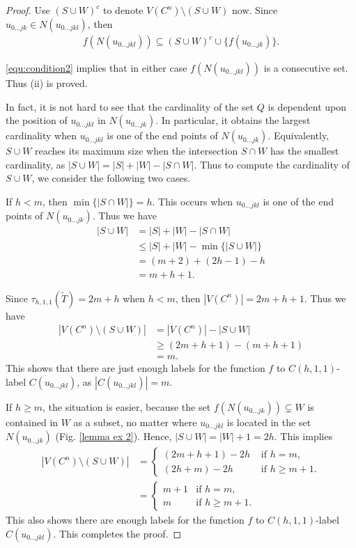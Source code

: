 \begin{proof}
Use $(S \cup W)^c$ to denote $V(C^n) \setminus (S \cup W)$ now. Since $u_{0\dots jk} \in N(u_{0\dots jkl})$, then 
\begin{align}
\label{equ:condition2}
f(N(u_{0\dots jkl})) \subseteq (S \cup W)^c \cup \{f(u_{0\dots jk})\}.
\end{align}

\eqref{equ:condition2} implies that in either case $f(N(u_{0\dots jkl}))$ is a consecutive set. Thus (ii) is proved.

In fact, it is not hard to see that the cardinality of the set $Q$ is dependent upon the position of $u_{0\dots jkl}$ in $N(u_{0\dots jk})$. In particular, it obtains the largest cardinality when $u_{0\dots jkl}$ is one of the end points of $N(u_{0\dots jk})$. Equivalently, $S \cup W$ reaches its maximum size when the intersection $S\cap W$ has the smallest cardinality, as $|S \cup W| = |S| + |W| - |S \cap W|$. Thus to compute the cardinality of $S\cup W$, we consider the following two cases. 

If $h < m$, then $\min\{|S \cap W|\} = h$. This occurs when $u_{0\dots jkl}$ is one of the end points of $N(u_{0\dots jk})$. Thus we have 
\begin{align*}
|S \cup W| &= |S| + |W| - |S \cap W| \\
& \le |S| + |W| - \min\{|S \cup W|\} \\
& = (m+2) + (2h-1) - h\\
&= m+h+1.
\end{align*}

Since $\tau_{h,1,1}(\tilde{T}) = 2m+h$ when $h < m$, then $|V(C^n)| = 2m+h+1$. Thus we have 
\begin{align*}
|V(C^n) \setminus (S \cup W)| &= |V(C^n)| - |S\cup W|\\
& \ge (2m+h+1) - (m+h+1) \\
&= m.
\end{align*}
This shows that there are just enough labels for the function $f$ to $C(h,1,1)$-label $C(u_{0\dots jkl})$, as $|C(u_{0\dots jkl})| = m$. 

If $h \ge m$, the situation is easier, because the set $f(N(u_{0\dots jk})) \subsetneq W$ is contained in $W$ as a subset, no matter where $u_{0\dots jkl}$ is located in the set $N(u_{0\dots jk})$ (Fig. \ref{lemma ex 2}). Hence, $|S \cup W| = |W| +1= 2h$. This implies 
\begin{align*}
 |V(C^n) \setminus (S \cup W)| &=
 \begin{cases}
 (2m+h+1) -2h & \text{ if } h =m,\\
 (2h+m)-2h & \text{ if } h \ge m+1.
 \end{cases}\\
&=  \begin{cases}
   m+1 & \text{if } h = m,\\
   m       & \text{if } h \ge  m+1.
  \end{cases}
\end{align*}
This also shows there are enough labels for the function $f$ to $C(h,1,1)$-label $C(u_{0\dots jkl})$. This completes the proof.  
\end{proof}
